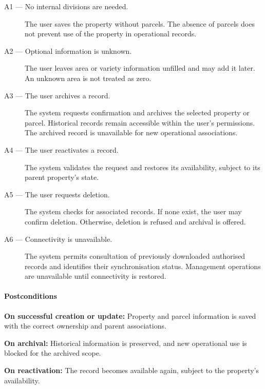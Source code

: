 \begin{description}

    \item[A1 --- No internal divisions are needed.]
    The user saves the property without parcels.
    The absence of parcels does not prevent
    use of the property in operational records.

    \item[A2 --- Optional information is unknown.]
    The user leaves area or variety information
    unfilled and may add it later.
    An unknown area is not treated as zero.

    \item[A3 --- The user archives a record.]
    The system requests confirmation and
    archives the selected property or parcel.
    Historical records remain accessible
    within the user's permissions.
    The archived record is unavailable
    for new operational associations.

    \item[A4 --- The user reactivates a record.]
    The system validates the request
    and restores its availability,
    subject to its parent property's state.

    \item[A5 --- The user requests deletion.]
    The system checks for associated records.
    If none exist, the user may confirm deletion.
    Otherwise, deletion is refused
    and archival is offered.

    \item[A6 --- Connectivity is unavailable.]
    The system permits consultation of
    previously downloaded authorised records
    and identifies their synchronisation status.
    Management operations are unavailable
    until connectivity is restored.
\end{description}

\paragraph{Postconditions}

\textbf{On successful creation or update:}
Property and parcel information is saved
with the correct ownership and parent associations.

\textbf{On archival:}
Historical information is preserved,
and new operational use is blocked
for the archived scope.

\textbf{On reactivation:}
The record becomes available again,
subject to the property's availability.

